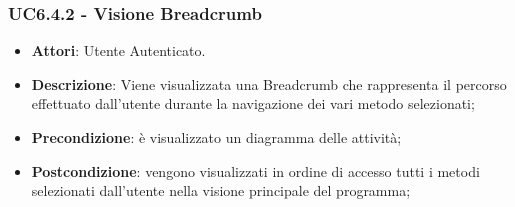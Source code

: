 \subsubsection{UC6.4.2 - Visione Breadcrumb} 
\label{sssec:UC6.4.2} 
\begin{itemize} 
\item \textbf{Attori}: Utente Autenticato.
\item \textbf{Descrizione}: Viene visualizzata una Breadcrumb che rappresenta il percorso effettuato dall'utente durante la navigazione dei vari metodo selezionati;
\item \textbf{Precondizione}: è visualizzato un diagramma delle attività;
\item \textbf{Postcondizione}: vengono visualizzati in ordine di accesso tutti i metodi selezionati dall'utente nella visione principale del programma;
\end{itemize} 
